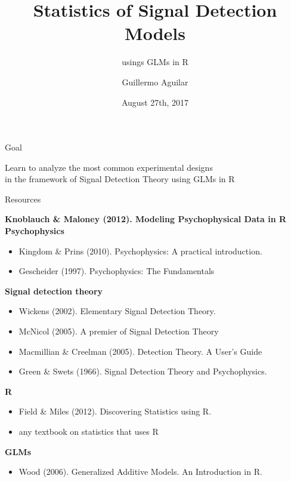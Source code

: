 \documentclass[10pt]{beamer}
\title
{Statistics of Signal Detection Models}
\subtitle{usings GLMs in R} %
\author{Guillermo Aguilar}
\institute[TU Berlin] %
{Technische Universit\"at Berlin}
\date[ECVP 2017]{August 27th, 2017}
\begin{document}
\begin{frame}
  \titlepage
\end{frame}

\begin{frame}{Goal}
\begin{center}
Learn to analyze the most common experimental designs \\
in the framework of Signal Detection Theory using GLMs  in R
\end{center}
\end{frame}

\begin{frame}
\tableofcontents
\end{frame}

\begin{frame}{Resources}

\textbf{Knoblauch \& Maloney (2012). Modeling Psychophysical Data in R}\\
\vspace{10pt}
\textbf{Psychophysics}
\begin{itemize}
\item Kingdom \& Prins (2010). Psychophysics: A practical introduction.
\item Gescheider (1997). Psychophysics: The Fundamentals
\end{itemize}

\textbf{Signal detection theory}
\begin{itemize}
\item Wickens (2002). Elementary Signal Detection Theory.
\item McNicol (2005). A premier of Signal Detection Theory
\item Macmillian \& Creelman (2005). Detection Theory. A User's Guide
\item Green \& Swets (1966). Signal Detection Theory and Psychophysics.
\end{itemize}

\textbf{R}
\begin{itemize}
\item Field \& Miles (2012). Discovering Statistics using R.
\item any textbook on statistics that uses R
\end{itemize}
\textbf{GLMs}
\begin{itemize}
\item Wood (2006). Generalized Additive Models. An Introduction in R.
\end{itemize}

\end{frame}
\end{document}
